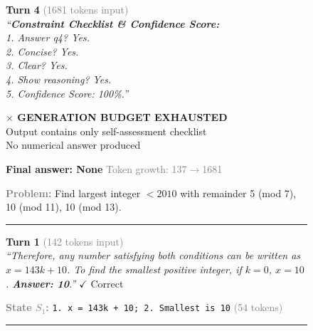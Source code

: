 \begin{figure}[!t]
\begin{minipage}[t]{0.48\textwidth}
\begin{mdframed}
    \textcolor{blue!70}{\textbf{Turn 4}} \textcolor{gray}{(1681 tokens input)}\\
    \textit{``\textbf{Constraint Checklist \& Confidence Score:}\\
    1. Answer q4? Yes.\\
    2. Concise? Yes.\\
    3. Clear? Yes.\\
    4. Show reasoning? Yes.\\
    5. Confidence Score: 100\%.''}

    \vspace{3pt}
    \colorbox{red!25}{\parbox{0.92\linewidth}{\centering\textbf{$\times$ GENERATION BUDGET EXHAUSTED}\\Output contains only self-assessment checklist\\No numerical answer produced}}

    \vspace{3pt}
    \textcolor{red!80}{\textbf{Final answer: None}} \hfill \textcolor{gray}{Token growth: 137$\rightarrow$1681}
    \end{mdframed}
  \end{minipage}%
  \hfill%
  \begin{minipage}[t]{0.48\textwidth}
    \begin{mdframed}[
      frametitle={\textbf{SLSC (Qwen3.5-4B) -- Success}},
      frametitlerule=true,
      frametitlebackgroundcolor=green!15,
      backgroundcolor=green!3,
      linecolor=green!60,
      linewidth=1pt,
      innertopmargin=6pt,
      innerbottommargin=6pt
    ]
    \textcolor{gray}{\textbf{Problem:}} Find largest integer $<2010$ with remainder 5 (mod 7), 10 (mod 11), 10 (mod 13).

    \vspace{2pt}\hrule\vspace{2pt}

    \textcolor{blue!70}{\textbf{Turn 1}} \textcolor{gray}{(142 tokens input)}\\
    \textit{``Therefore, any number satisfying both conditions can be written as $x = 143k + 10$. To find the smallest positive integer, if $k=0$, $x=10$. \textbf{Answer: 10}.''}
    \hfill{\scriptsize\textcolor{green!60!black}{$\checkmark$ Correct}}

    \textcolor{gray}{\textbf{State $S_1$:}} \texttt{1. x = 143k + 10; 2. Smallest is 10} \textcolor{gray}{(54 tokens)}

    \vspace{2pt}\hrule\vspace{2pt}


\end{mdframed}
\end{minipage}
\end{figure}
